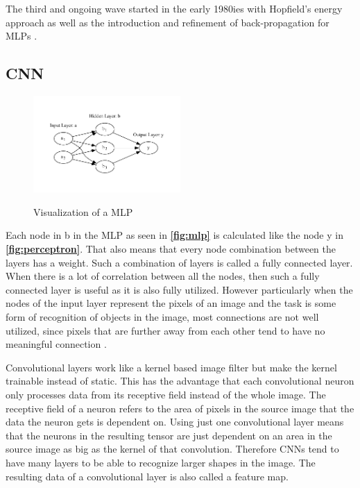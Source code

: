 \documentclass[10pt]{book}
\newcommand{\figureref}[1]{\textbf{\autoref{#1}}}
\begin{document}
The third and ongoing wave started in the early 1980ies with Hopfield's energy approach \cite{hopfield1982neural} as well as the introduction and refinement of back-propagation for \acp{MLP} \cite{werbos1974beyond,rumelhart1986parallel}.

\subsection{CNN}

\begin{figure}
  \caption{Visualization of a \ac{MLP}}
  \includegraphics[width=0.5\textwidth]{graph/mlp}
  \label{fig:mlp} 
\end{figure}

Each node in b in the \ac{MLP} as seen in \figureref{fig:mlp} is calculated like the node y in \figureref{fig:perceptron}. That also means that every node combination between the layers has a weight. Such a combination of layers is called a fully connected layer. When there is a lot of correlation between all the nodes, then such a fully connected layer is useful as it is also fully utilized. However particularly when the nodes of the input layer represent the pixels of an image and the task is some form of recognition of objects in the image, most connections are not well utilized, since pixels that are further away from each other tend to have no meaningful connection \cite{aghdam2017guide}.

Convolutional layers work like a kernel based image filter but make the kernel trainable instead of static. This has the advantage that each convolutional neuron only processes data from its receptive field instead of the whole image. The receptive field of a neuron refers to the area of pixels in the source image that the data the neuron gets is dependent on. Using just one convolutional layer means that the neurons in the resulting tensor are just dependent on an area in the source image as big as the kernel of that convolution. Therefore \acp{CNN} tend to have many layers to be able to recognize larger shapes in the image. The resulting data of a convolutional layer is also called a feature map. 
\end{document}
